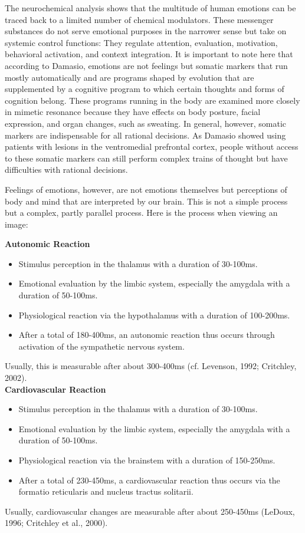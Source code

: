 The neurochemical analysis shows that the multitude of human emotions can be traced back to a limited number of chemical modulators. These messenger substances do not serve emotional purposes in the narrower sense but take on systemic control functions: They regulate attention, evaluation, motivation, behavioral activation, and context integration. It is important to note here that according to Damasio, emotions are not feelings but somatic markers that run mostly automatically and are programs shaped by evolution that are supplemented by a cognitive program to which certain thoughts and forms of cognition belong. These programs running in the body are examined more closely in mimetic resonance because they have effects on body posture, facial expression, and organ changes, such as sweating. In general, however, somatic markers are indispensable for all rational decisions. As Damasio showed using patients with lesions in the ventromedial prefrontal cortex, people without access to these somatic markers can still perform complex trains of thought but have difficulties with rational decisions.

Feelings of emotions, however, are not emotions themselves but perceptions of body and mind that are interpreted by our brain. This is not a simple process but a complex, partly parallel process. Here is the process when viewing an image:

\textbf{Autonomic Reaction}

\begin{itemize}
  \item Stimulus perception in the thalamus with a duration of 30-100ms.
  \item Emotional evaluation by the limbic system, especially the amygdala with a duration of 50-100ms.
  \item Physiological reaction via the hypothalamus with a duration of 100-200ms.
  \item After a total of 180-400ms, an autonomic reaction thus occurs through activation of the sympathetic nervous system.
\end{itemize}
Usually, this is measurable after about 300-400ms (cf. Levenson, 1992; Critchley, 2002).\\

\textbf{Cardiovascular Reaction}

\begin{itemize}
  \item Stimulus perception in the thalamus with a duration of 30-100ms.
  \item Emotional evaluation by the limbic system, especially the amygdala with a duration of 50-100ms.
  \item Physiological reaction via the brainstem with a duration of 150-250ms.
  \item After a total of 230-450ms, a cardiovascular reaction thus occurs via the formatio reticularis and nucleus tractus solitarii.
\end{itemize}
Usually, cardiovascular changes are measurable after about 250-450ms (LeDoux, 1996; Critchley et al., 2000).

